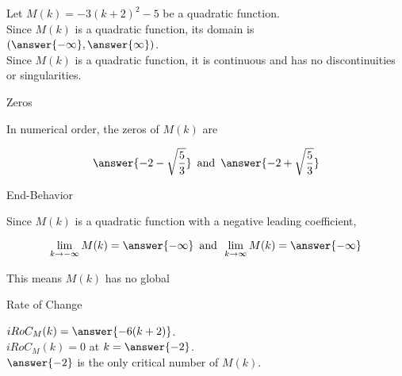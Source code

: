 \documentclass{ximera}
\author{Lee Wayand}
\begin{document}
\begin{exercise} 









Let $M(k) = -3(k+2)^2 - 5$ be a quadratic function. \\




Since $M(k)$ is a quadratic function, its domain is $\left( \answer{-\infty}, \answer{\infty} \right)$. \\


Since $M(k)$ is a quadratic function, it is continuous and has no discontinuities or singularities. \\





\begin{question} Zeros



In numerical order, the zeros of $M(k)$ are

\[
\answer{-2 - \sqrt{\frac{5}{3}}} \, \text{ and } \, \answer{-2 + \sqrt{\frac{5}{3}}}
\]

\end{question}






\begin{question} End-Behavior



Since $M(k)$ is a quadratic function with a negative leading coefficient,

\[
\lim\limits_{k \to -\infty}M(k) = \answer{-\infty} \, \text{ and } \, \lim\limits_{k \to \infty}M(k) = \answer{-\infty}
\]


This means $M(k)$ has no global  

\end{question}




\begin{question}   Rate of Change



$iRoC_M(k) = \answer{-6(k+2)}$. \\



$iRoC_M(k) = 0$  at  $k = \answer{-2}$. \\


$\answer{-2}$ is the only critical number of $M(k)$. \\



\end{question}
\end{exercise}
\end{document}

